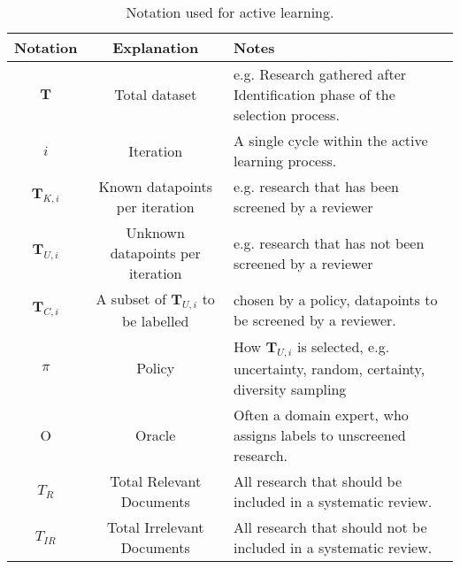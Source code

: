 
\begin{table*}[t]
    \centering
    \footnotesize

    \begin{tabular}{|c|c|>{\raggedright\arraybackslash}p{11cm}|}
        \hline
        \textbf{Notation}    & \textbf{Explanation}                            & \textbf{Notes}                                                                                \\
        \hline
        \(\textbf{T}\)       & Total dataset                                   & e.g. Research gathered after Identification phase of the selection process.                   \\
        \hline
        \(i\)                & Iteration                                       & A single cycle within the active learning process.                                            \\
        \hline
        \(\textbf{T}_{K,i}\) & Known datapoints per iteration                  & e.g. research that has been screened by a reviewer                                            \\
        \hline
        \(\textbf{T}_{U,i}\) & Unknown datapoints per iteration                & e.g. research that has not been screened by a reviewer                                        \\
        \hline
        \(\textbf{T}_{C,i}\) & A subset of \(\textbf{T}_{U,i}\) to be labelled & chosen by a policy, datapoints to be screened by a reviewer.                                  \\
        \hline
        $\pi$                & Policy                                          & How \(\textbf{T}_{U,i}\) is selected, e.g. uncertainty, random, certainty, diversity sampling \\
        \hline
        O                    & Oracle                                          & Often a domain expert, who assigns labels to unscreened research.                             \\
        \hline
        \(T_R\)              & Total Relevant Documents                        & All research that should be included in a systematic review.                                  \\
        \hline
        \(T_{IR}\)           & Total Irrelevant Documents                      & All research that should not be included in a systematic review.                              \\
        \hline
    \end{tabular}
    \caption{Notation used for active learning.}
    \label{tab:notation}
\end{table*}
